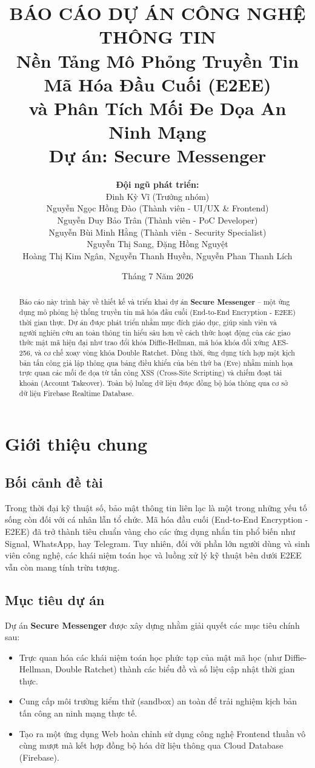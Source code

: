 \documentclass[12pt,a4paper]{article}
\title{
    \textbf{BÁO CÁO DỰ ÁN CÔNG NGHỆ THÔNG TIN}\\
    [0.5cm]
    \Large{Nền Tảng Mô Phỏng Truyền Tin Mã Hóa Đầu Cuối (E2EE) \\ và Phân Tích Mối Đe Dọa An Ninh Mạng}\\
    [1cm]
    \large{\textbf{Dự án: Secure Messenger}}
}
\author{
    \textbf{Đội ngũ phát triển:} \\
    Đinh Kỳ Vĩ (Trưởng nhóm) \\
    Nguyễn Ngọc Hồng Đào (Thành viên - UI/UX \& Frontend) \\
    Nguyễn Duy Bảo Trân (Thành viên - PoC Developer) \\
    Nguyễn Bùi Minh Hằng (Thành viên - Security Specialist) \\
    Nguyễn Thị Sang, Đặng Hồng Nguyệt \\
    Hoàng Thị Kim Ngân, Nguyễn Thanh Huyền, Nguyễn Phan Thanh Lích
}
\date{Tháng 7 Năm 2026}
\begin{document}
\maketitle
\newpage

\begin{abstract}
Báo cáo này trình bày về thiết kế và triển khai dự án \textbf{Secure Messenger} -- một ứng dụng mô phỏng hệ thống truyền tin mã hóa đầu cuối (End-to-End Encryption - E2EE) thời gian thực. Dự án được phát triển nhằm mục đích giáo dục, giúp sinh viên và người nghiên cứu an toàn thông tin hiểu sâu hơn về cách thức hoạt động của các giao thức mật mã hiện đại như trao đổi khóa Diffie-Hellman, mã hóa khóa đối xứng AES-256, và cơ chế xoay vòng khóa Double Ratchet. Đồng thời, ứng dụng tích hợp một kịch bản tấn công giả lập thông qua bảng điều khiển của bên thứ ba (Eve) nhằm minh họa trực quan các mối đe dọa từ tấn công XSS (Cross-Site Scripting) và chiếm đoạt tài khoản (Account Takeover). Toàn bộ luồng dữ liệu được đồng bộ hóa thông qua cơ sở dữ liệu Firebase Realtime Database.
\end{abstract}

\tableofcontents
\newpage

\section{Giới thiệu chung}
\subsection{Bối cảnh đề tài}
Trong thời đại kỹ thuật số, bảo mật thông tin liên lạc là một trong những yếu tố sống còn đối với cá nhân lẫn tổ chức. Mã hóa đầu cuối (End-to-End Encryption - E2EE) đã trở thành tiêu chuẩn vàng cho các ứng dụng nhắn tin phổ biến như Signal, WhatsApp, hay Telegram. Tuy nhiên, đối với phần lớn người dùng và sinh viên công nghệ, các khái niệm toán học và luồng xử lý kỹ thuật bên dưới E2EE vẫn còn mang tính trừu tượng.

\subsection{Mục tiêu dự án}
Dự án \textbf{Secure Messenger} được xây dựng nhằm giải quyết các mục tiêu chính sau:
\begin{itemize}
    \item Trực quan hóa các khái niệm toán học phức tạp của mật mã học (như Diffie-Hellman, Double Ratchet) thành các biểu đồ và số liệu cập nhật thời gian thực.
    \item Cung cấp môi trường kiểm thử (sandbox) an toàn để trải nghiệm kịch bản tấn công an ninh mạng thực tế.
    \item Tạo ra một ứng dụng Web hoàn chỉnh sử dụng công nghệ Frontend thuần vô cùng mượt mà kết hợp đồng bộ hóa dữ liệu thông qua Cloud Database (Firebase).
\end{itemize}
\end{document}
